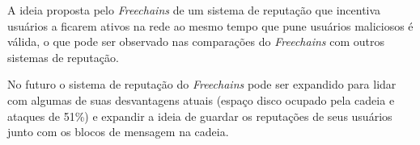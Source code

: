 \documentclass[12pt]{article}
\newcommand{\FC} {\emph{Freechains}\xspace}
\begin{document}
A ideia proposta pelo \FC de um sistema de reputação que incentiva usuários a ficarem ativos na rede ao mesmo tempo que pune usuários maliciosos é válida, o que pode ser observado nas comparações do \FC com outros sistemas de reputação. 


No futuro o sistema de reputação do \FC pode ser expandido para lidar com algumas de suas desvantagens atuais (espaço disco ocupado pela cadeia e ataques de 51\%) e expandir a ideia de guardar os reputações de seus usuários junto com os blocos de mensagem na cadeia.



\end{document}

